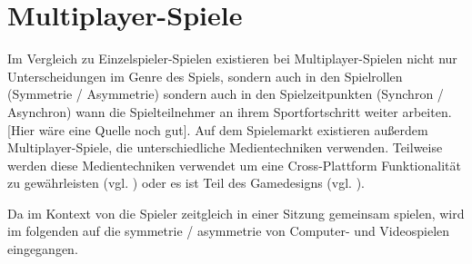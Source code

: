 





\section{Multiplayer-Spiele}
Im Vergleich zu Einzelspieler-Spielen existieren bei Multiplayer-Spielen nicht nur Unterscheidungen im Genre des Spiels, sondern auch in den Spielrollen (Symmetrie / Asymmetrie) sondern auch in den Spielzeitpunkten (Synchron / Asynchron) wann die Spielteilnehmer an ihrem Sportfortschritt weiter arbeiten. [Hier wäre eine Quelle noch gut]. Auf dem Spielemarkt existieren außerdem Multiplayer-Spiele, die unterschiedliche Medientechniken verwenden. Teilweise werden diese Medientechniken verwendet um eine Cross-Plattform Funktionalität zu gewährleisten (vgl. \cite{noauthor_baldurs_nodate}) oder es ist Teil des Gamedesigns (vgl. \cite{noauthor_keep_nodate}).

Da im Kontext von  die Spieler zeitgleich in einer Sitzung gemeinsam spielen, wird im folgenden auf die symmetrie / asymmetrie von Computer- und Videospielen eingegangen.


